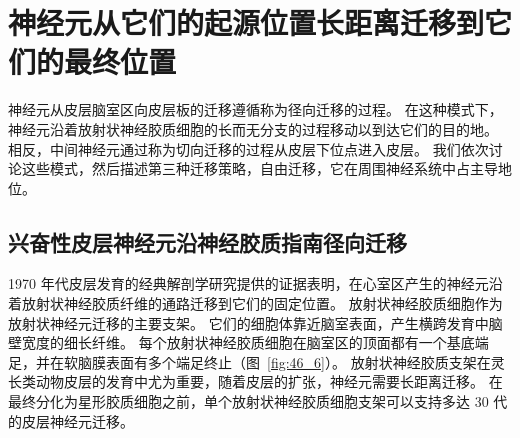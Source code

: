 \section{神经元从它们的起源位置长距离迁移到它们的最终位置}

神经元从皮层脑室区向皮层板的迁移遵循称为径向迁移的过程。
在这种模式下，神经元沿着放射状神经胶质细胞的长而无分支的过程移动以到达它们的目的地。
相反，中间神经元通过称为切向迁移的过程从皮层下位点进入皮层。
我们依次讨论这些模式，然后描述第三种迁移策略，自由迁移，它在周围神经系统中占主导地位。



\subsection{兴奋性皮层神经元沿神经胶质指南径向迁移}

1970 年代皮层发育的经典解剖学研究提供的证据表明，在心室区产生的神经元沿着放射状神经胶质纤维的通路迁移到它们的固定位置。
放射状神经胶质细胞作为放射状神经元迁移的主要支架。
它们的细胞体靠近脑室表面，产生横跨发育中脑壁宽度的细长纤维。
每个放射状神经胶质细胞在脑室区的顶面都有一个基底端足，并在软脑膜表面有多个端足终止（图~\ref{fig:46_6}）。
放射状神经胶质支架在灵长类动物皮层的发育中尤为重要，随着皮层的扩张，神经元需要长距离迁移。
在最终分化为星形胶质细胞之前，单个放射状神经胶质细胞支架可以支持多达 30 代的皮层神经元迁移。


